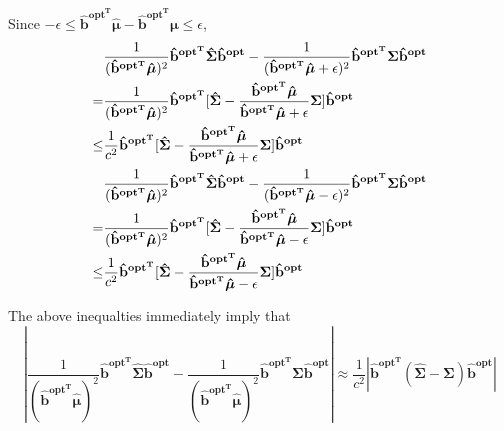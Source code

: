\documentclass{gapd}
\begin{document}
Since $-\epsilon \le \mathbf{\hat{b}^{{opt}^T}}\boldsymbol{\hat{\mu}}-\mathbf{\hat{b}^{{opt}^T}}\boldsymbol{\mu} \le \epsilon$,
\begin{equation}
\begin{aligned}
&\frac{1}{(\mathbf{\hat{b}^{{opt}^T}}\boldsymbol{\hat{\mu}})^2}\mathbf{\hat{b}^{{opt}^T}}\boldsymbol{\hat{\Sigma}}\mathbf{\hat{b}^{opt}}-\frac{1}{(\mathbf{\hat{b}^{{opt}^T}}\boldsymbol{\hat{\mu}}+\epsilon)^2}\mathbf{\hat{b}^{{opt}^T}}\boldsymbol{\Sigma}\mathbf{\hat{b}^{opt}}\\
=& \frac{1}{(\mathbf{\hat{b}^{{opt}^T}}\boldsymbol{\hat{\mu}})^2}\mathbf{\hat{b}^{{opt}^T}}[\boldsymbol{\hat{\Sigma}}-\frac{\mathbf{\hat{b}^{{opt}^T}}\boldsymbol{\hat{\mu}}}{\mathbf{\hat{b}^{{opt}^T}}\boldsymbol{\hat{\mu}}+\epsilon}\boldsymbol{\Sigma}]\mathbf{\hat{b}^{opt}}\\
\le& \frac{1}{c^2}\mathbf{\hat{b}^{{opt}^T}}[\boldsymbol{\hat{\Sigma}}-\frac{\mathbf{\hat{b}^{{opt}^T}}\boldsymbol{\hat{\mu}}}{\mathbf{\hat{b}^{{opt}^T}}\boldsymbol{\hat{\mu}}+\epsilon}\boldsymbol{\Sigma}]\mathbf{\hat{b}^{opt}}\\
&\frac{1}{(\mathbf{\hat{b}^{{opt}^T}}\boldsymbol{\hat{\mu}})^2}\mathbf{\hat{b}^{{opt}^T}}\boldsymbol{\hat{\Sigma}}\mathbf{\hat{b}^{opt}}-\frac{1}{(\mathbf{\hat{b}^{{opt}^T}}\boldsymbol{\hat{\mu}}-\epsilon)^2}\mathbf{\hat{b}^{{opt}^T}}\boldsymbol{\Sigma}\mathbf{\hat{b}^{opt}}\\
=& \frac{1}{(\mathbf{\hat{b}^{{opt}^T}}\boldsymbol{\hat{\mu}})^2}\mathbf{\hat{b}^{{opt}^T}}[\boldsymbol{\hat{\Sigma}}-\frac{\mathbf{\hat{b}^{{opt}^T}}\boldsymbol{\hat{\mu}}}{\mathbf{\hat{b}^{{opt}^T}}\boldsymbol{\hat{\mu}}-\epsilon}\boldsymbol{\Sigma}]\mathbf{\hat{b}^{opt}}\\
\le& \frac{1}{c^2}\mathbf{\hat{b}^{{opt}^T}}[\boldsymbol{\hat{\Sigma}}-\frac{\mathbf{\hat{b}^{{opt}^T}}\boldsymbol{\hat{\mu}}}{\mathbf{\hat{b}^{{opt}^T}}\boldsymbol{\hat{\mu}}-\epsilon}\boldsymbol{\Sigma}]\mathbf{\hat{b}^{opt}}
\end{aligned}\notag
\end{equation}

The above inequalties immediately imply that
$$|\frac{1}{(\mathbf{\hat{b}^{{opt}^T}}\boldsymbol{\hat{\mu}})^2}\mathbf{\hat{b}^{{opt}^T}}\boldsymbol{\hat{\Sigma}}\mathbf{\hat{b}^{opt}}- \frac{1}{(\mathbf{\hat{b}^{{opt}^T}}\boldsymbol{\hat{\mu}})^2}\mathbf{\hat{b}^{{opt}^T}}\boldsymbol{\Sigma}\mathbf{\hat{b}^{opt}}| \approx \frac{1}{c^2}|\mathbf{\hat{b}^{{opt}^T}}(\boldsymbol{\hat{\Sigma}}-\boldsymbol{\Sigma})\mathbf{\hat{b}^{opt}}|$$
\end{document}
